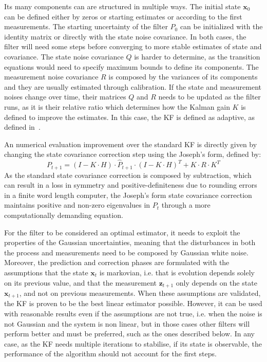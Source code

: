 Its many components can are structured in multiple ways.
The initial state $\mathbf{x}_{0}$ can be defined either by zeros or starting estimates or according to the first measurements. 
The starting uncertainty of the filter $P_0$ can be initialized with the identity matrix or directly with the state noise covariance. In both cases, the filter will need some steps before converging to more stable estimates of state and covariance.
The state noise covariance $Q$ is harder to determine, as the transition equations would need to specify maximum bounds to define its components.
The measurement noise covariance $R$ is composed by the variances of its components and they are usually estimated through calibration.
If the state and measurement noises change over time, their matrices $Q$ and $R$ needs to be updated as the filter runs, as it is their relative ratio which determines how the Kalman gain $K$ is defined to improve the estimates. In this case, the \gls{KF} is defined as adaptive, as defined in~\cite{1099422}.


An numerical evaluation improvement over the standard \gls{KF} is directly given by changing the state covariance correction step using the Joseph’s form\cite{schmidt_analysis_2010}, defined by:
\begin{equation}
    P_{t+1} = (I - K \cdot H) \cdot \hat{P}_{t+1} \cdot (I - K \cdot H)^T + K \cdot R \cdot K^T
\end{equation}
As the standard state covariance correction is composed by subtraction, which can result in a loss in symmetry and positive-definiteness due to rounding errors in a finite word length computer, the Joseph’s form state covariance correction maintains positive and non-zero eigenvalues in $P_t$ through a more computationally demanding equation\cite{BarShalom2001EstimationWA}.

For the filter to be considered an optimal estimator, it needs to exploit the properties of the Gaussian uncertainties, meaning that the disturbances in both the process and measurements need to be composed by Gaussian white noise.
Moreover, the prediction and correction phases are formulated with the assumptions that the state $\mathbf{x}_t$ is markovian, i.e. that is evolution depends solely on its previous value, and that the measurement $\mathbf{z}_{t+1}$ only depends on the state $\mathbf{x}_{t+1}$, and not on previous measurements.
When these assumptions are validated, the \gls{KF} is proven to be the best linear estimator possible.
However, it can be used with reasonable results even if the assumptions are not true, i.e. when the noise is not Gaussian and the system is non linear, but in those cases other filters will perform better and must be preferred, such as the ones described below.
In any case, as the \gls{KF} needs multiple iterations to stabilise, if its state is observable, the performance of the algorithm should not account for the first steps.

